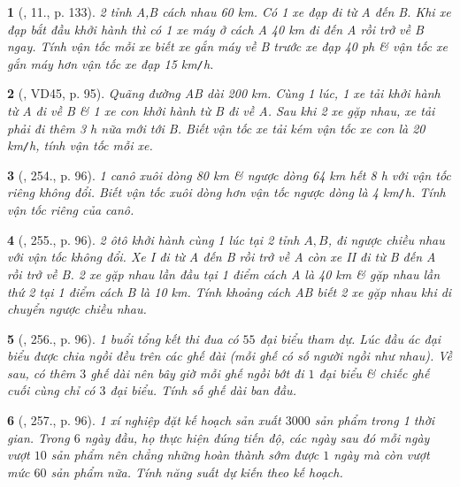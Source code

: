 \documentclass{article}
\newtheorem{baitoan}{}
\begin{document}
\begin{baitoan}[\cite{Kien_dai_so_9}, 11., p. 133]
	2 tỉnh A,B cách nhau {\rm60 km}. Có 1 xe đạp đi từ A đến B. Khi xe đạp bắt đầu khởi hành thì có 1 xe máy ở cách A {\rm40 km} đi đến A rồi trở về B ngay. Tính vận tốc mỗi xe biết xe gắn máy về B trước xe đạp {\rm40 ph} \& vận tốc xe gắn máy hơn vận tốc xe đạp {\rm15 km{\tt/}h}.
\end{baitoan}

\begin{baitoan}[\cite{Tuyen_Toan_9_old}, VD45, p. 95]
	Quãng đường AB dài {\rm200 km}. Cùng 1 lúc, 1 xe tải khởi hành từ A đi về B \& 1 xe con khởi hành từ B đi về A. Sau khi 2 xe gặp nhau, xe tải phải đi thêm {\rm3 h} nữa mới tới B. Biết vận tốc xe tải kém vận tốc xe con là {\rm20 km{\tt/}h}, tính vận tốc mỗi xe.
\end{baitoan}

\begin{baitoan}[\cite{Tuyen_Toan_9_old}, 254., p. 96]
	1 canô xuôi dòng {\rm80 km} \& ngược dòng {\rm64 km} hết {\rm8 h} với vận tốc riêng không đổi. Biết vận tốc xuôi dòng hơn vận tốc ngược dòng là {\rm4 km{\tt/}h}. Tính vận tốc riêng của canô.
\end{baitoan}

\begin{baitoan}[\cite{Tuyen_Toan_9_old}, 255., p. 96]
	2 ôtô khởi hành cùng 1 lúc tại 2 tỉnh $A,B$, đi ngược chiều nhau với vận tốc không đổi. Xe I đi từ A đến B rồi trở về A còn xe II đi từ B đến A rồi trở về B. 2 xe gặp nhau lần đầu tại 1 điểm cách A là {\rm40 km} \& gặp nhau lần thứ 2 tại 1 điểm cách B là {\rm10 km}. Tính khoảng cách AB biết 2 xe gặp nhau khi di chuyển ngược chiều nhau.
\end{baitoan}

\begin{baitoan}[\cite{Tuyen_Toan_9_old}, 256., p. 96]
	1 buổi tổng kết thi đua có $55$ đại biểu tham dự. Lúc đầu ác đại biểu được chia ngồi đều trên các ghế đài (mỗi ghế có số người ngồi như nhau). Về sau, có thêm $3$ ghế dài nên bây giờ mỗi ghế ngồi bớt đi $1$ đại biểu \& chiếc ghế cuối cùng chỉ có $3$ đại biểu. Tính số ghế dài ban đầu.
\end{baitoan}

\begin{baitoan}[\cite{Tuyen_Toan_9_old}, 257., p. 96]
	1 xí nghiệp đặt kế hoạch sản xuất $3000$ sản phẩm trong 1 thời gian. Trong $6$ ngày đầu, họ thực hiện đúng tiến độ, các ngày sau đó mỗi ngày vượt $10$ sản phẩm nên chẳng những hoàn thành sớm được $1$ ngày mà còn vượt mức $60$ sản phẩm nữa. Tính năng suất dự kiến theo kế hoạch.
\end{baitoan}
\end{document}
